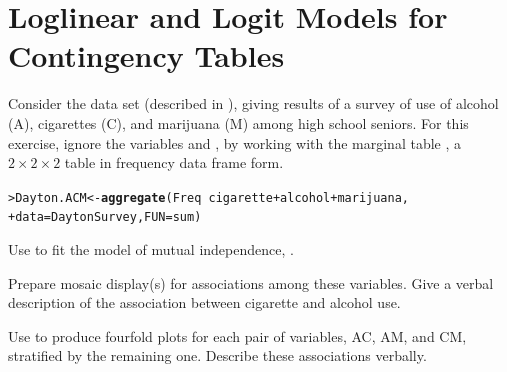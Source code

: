 \documentclass[10pt]{report}\usepackage[]{graphicx}\usepackage[]{color}
\makeatletter
\newcommand{\hlopt}[1]{\textcolor[rgb]{0,0,0}{#1}}%
\newcommand{\hlstd}[1]{\textcolor[rgb]{0.345,0.345,0.345}{#1}}%
\newcommand{\hlkwb}[1]{\textcolor[rgb]{0.69,0.353,0.396}{#1}}%
\newcommand{\hlkwc}[1]{\textcolor[rgb]{0.333,0.667,0.333}{#1}}%
\newcommand{\hlkwd}[1]{\textcolor[rgb]{0.737,0.353,0.396}{\textbf{#1}}}%
\newenvironment{kframe}{%
 \def\at@end@of@kframe{}%
 \ifinner\ifhmode%
  \def\at@end@of@kframe{\end{minipage}}%
  \begin{minipage}{\columnwidth}%
 \fi\fi%
 \def\FrameCommand##1{\hskip\@totalleftmargin \hskip-\fboxsep
 \colorbox{shadecolor}{##1}\hskip-\fboxsep
     \hskip-\linewidth \hskip-\@totalleftmargin \hskip\columnwidth}%
 \MakeFramed {\advance\hsize-\width
   \@totalleftmargin\z@ \linewidth\hsize
   \@setminipage}}%
 {\par\unskip\endMakeFramed%
 \at@end@of@kframe}
\newenvironment{knitrout}{}{} %
\renewenvironment{knitrout}{\small\renewcommand{\baselinestretch}{.85}}{} %
\makeatother
\begin{document}
\chapter{Loglinear and Logit Models for Contingency Tables}\label{ch:loglin}

\begin{Exercises}

  \exercise Consider the data set  (described in ), giving
  results of a survey of use of alcohol (A), cigarettes (C), and marijuana (M) among high school
  seniors.  For this exercise, ignore the variables  and , by working with the
  marginal table , a $2 \times 2 \times 2$ table in frequency data frame form.
\begin{knitrout}\footnotesize
{}\color{fgcolor}\begin{kframe}
\begin{alltt}
\hlstd{> }\hlstd{Dayton.ACM} \hlkwb{<-} \hlkwd{aggregate}\hlstd{(Freq} \hlopt{~} \hlstd{cigarette} \hlopt{+} \hlstd{alcohol} \hlopt{+} \hlstd{marijuana,}
\hlstd{+ }                        \hlkwc{data}\hlstd{=DaytonSurvey,} \hlkwc{FUN}\hlstd{=sum)}
\end{alltt}
\end{kframe}
\end{knitrout}
  \begin{enumerate*}
  
    \item Use  to fit the model of mutual independence, .
    \begin{ans}
    \end{ans}
    
    \item Prepare mosaic display(s) for associations among these variables.
    Give a verbal description of the association between cigarette and alcohol use.
    \begin{ans}
    \end{ans}
    
    \item Use  to produce fourfold plots for each pair of variables,
    AC, AM, and CM, stratified by the remaining one.
    Describe these associations verbally.
    \begin{ans}
    \end{ans}
    
  \end{enumerate*}
  

\end{Exercises}
\end{document}
